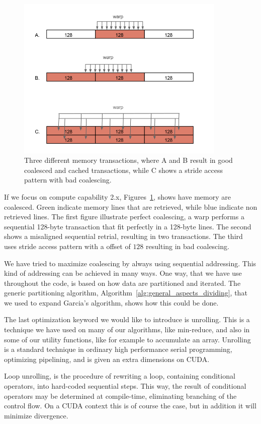 \begin{figure}[ht!]
    \centering
    \includegraphics[width=100mm]{../gfx/memory_coalecing.png}
    \caption{Three different memory transactions, where A and B result in good coalesced and cached transactions, while C shows a stride access pattern with bad coalescing.}
    \label{fig:coalesing_memory}
\end{figure}

If we focus on compute capability 2.x, Figures~\ref{fig:coalesing_memory}, shows have memory are coalesced. Green indicate memory lines that are retrieved, while blue indicate non retrieved lines. The first figure illustrate perfect coalescing, a warp performs a sequential 128-byte transaction that fit perfectly in a 128-byte lines. The second shows a misaligned sequential retrial, resulting in two transactions. The third uses stride access pattern with a offset of $128$ resulting in bad coalescing.

We have tried to maximize coalescing by always using sequential addressing. This kind of addressing can be achieved in many ways. One way, that we have use throughout the code, is based on how data are partitioned and iterated. The generic partitioning algorithm, Algorithm~\ref{alg:general_aspects_dividing}, that we used to expand Garcia's algorithm, shows how this could be done.     


The last optimization keyword we would like to introduce is unrolling. This is a technique we have used on many of our algorithms, like min-reduce, and also in some of our utility functions, like for example to accumulate an array. Unrolling is a standard technique in ordinary high performance serial programming, optimizing pipelining, and is given an extra dimensions on CUDA\@. 

Loop unrolling, is the procedure of rewriting a loop, containing conditional operators, into hard-coded sequential steps. This way, the result of conditional operators may be determined at compile-time, eliminating branching of the control flow. On a CUDA context this is of course the case, but in addition it will minimize divergence.

